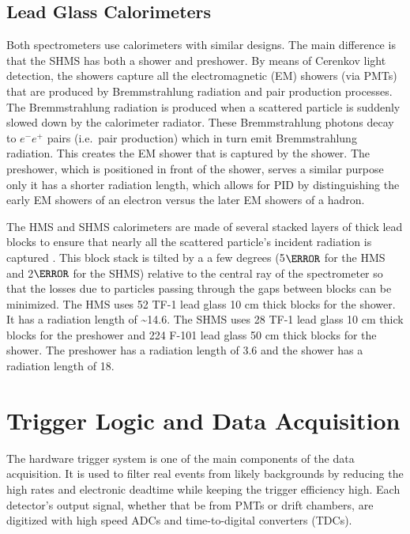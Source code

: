 \documentclass[
]{report}
\begin{document}
\hypertarget{lead-glass-calorimeters}{%
\subsection{Lead Glass Calorimeters}\label{lead-glass-calorimeters}}

Both spectrometers use calorimeters with similar designs. The main
difference is that the SHMS has both a shower and preshower. By means of
Cerenkov light detection, the showers capture all the electromagnetic
(EM) showers (via PMTs) that are produced by Bremmstrahlung radiation
and pair production processes. The Bremmstrahlung radiation is produced
when a scattered particle is suddenly slowed down by the calorimeter
radiator. These Bremmstrahlung photons decay to \(e^-e^+\) pairs
(i.e.~pair production) which in turn emit Bremmstrahlung radiation. This
creates the EM shower that is captured by the shower. The preshower,
which is positioned in front of the shower, serves a similar purpose
only it has a shorter radiation length, which allows for PID by
distinguishing the early EM showers of an electron versus the later EM
showers of a hadron.



The HMS and SHMS calorimeters are made of several stacked layers of
thick lead blocks to ensure that nearly all the scattered particle's
incident radiation is captured \cite{mkrtchyan_lead-glass_2013}. This
block stack is tilted by a a few degrees (5\(\degree\) for the HMS and
2\(\degree\) for the SHMS) relative to the central ray of the
spectrometer so that the losses due to particles passing through the
gaps between blocks can be minimized. The HMS uses 52 TF-1 lead glass 10
cm thick blocks for the shower. It has a radiation length of
\textasciitilde14.6. The SHMS uses 28 TF-1 lead glass 10 cm thick blocks
for the preshower and 224 F-101 lead glass 50 cm thick blocks for the
shower. The preshower has a radiation length of 3.6 and the shower has a
radiation length of 18.

\hypertarget{Section-4.7}{%
\section{Trigger Logic and Data Acquisition}\label{Section-4.7}}

The hardware trigger system is one of the main components of the data
acquisition. It is used to filter real events from likely backgrounds by
reducing the high rates and electronic deadtime while keeping the
trigger efficiency high. Each detector's output signal, whether that be
from PMTs or drift chambers, are digitized with high speed ADCs and
time-to-digital converters (TDCs).
\end{document}
